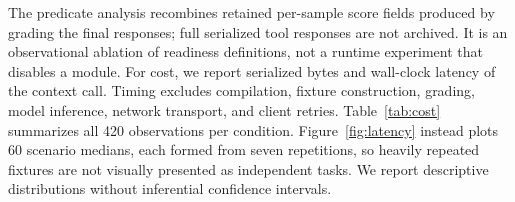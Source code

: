The predicate analysis recombines retained per-sample score fields produced by grading the final responses; full serialized tool responses are not archived. It is an observational ablation of readiness definitions, not a runtime experiment that disables a module. For cost, we report serialized bytes and wall-clock latency of the context call. Timing excludes compilation, fixture construction, grading, model inference, network transport, and client retries. Table~\ref{tab:cost} summarizes all 420 observations per condition. Figure~\ref{fig:latency} instead plots 60 scenario medians, each formed from seven repetitions, so heavily repeated fixtures are not visually presented as independent tasks. We report descriptive distributions without inferential confidence intervals.
